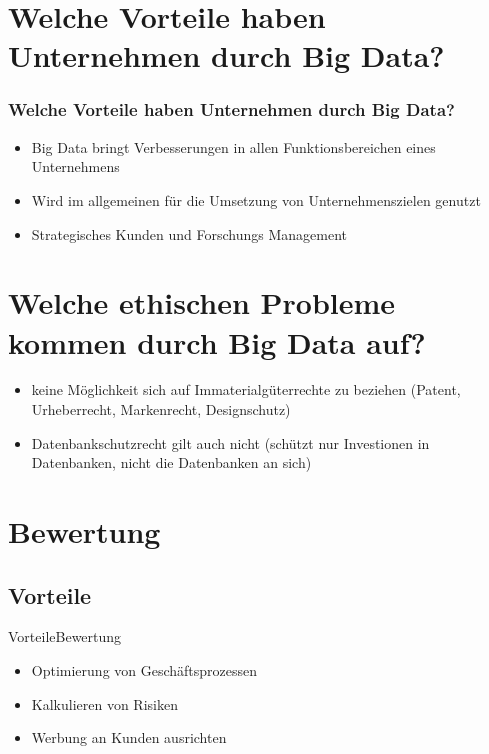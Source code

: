 \documentclass[10pt,a4paper]{beamer}
\begin{document}
\section{Welche Vorteile haben Unternehmen durch Big Data?}
\begin{frame}
\frametitle{Welche Vorteile haben Unternehmen durch Big Data?}
\begin{itemize}
	\item Big Data bringt Verbesserungen in allen Funktionsbereichen eines Unternehmens \pause
	\item Wird im allgemeinen für die Umsetzung von Unternehmenszielen genutzt \pause
	\item Strategisches Kunden und Forschungs Management
\end{itemize}
\end{frame}

\section{Welche ethischen Probleme kommen durch Big Data auf?}
\begin{frame}
\begin{itemize}
  \frametitle{Welche ethischen Probleme kommen durch Big Data auf?}		  
\frametitle{Welche ethischen Probleme kommen durch Big Data auf?}
\item keine Möglichkeit sich auf Immaterialgüterrechte zu beziehen (Patent, Urheberrecht, Markenrecht, Designschutz)\pause
\item Datenbankschutzrecht gilt auch nicht (schützt nur Investionen in Datenbanken, nicht die Datenbanken an sich)
\end{itemize}
\end{frame}

\section{Bewertung}
\subsection{Vorteile}
\begin{frame}{Vorteile}{Bewertung}
\begin{itemize}
\item Optimierung von Geschäftsprozessen \pause
\item Kalkulieren von Risiken \pause
\item Werbung an Kunden ausrichten
\end{itemize}
\end{frame}
\end{document}
